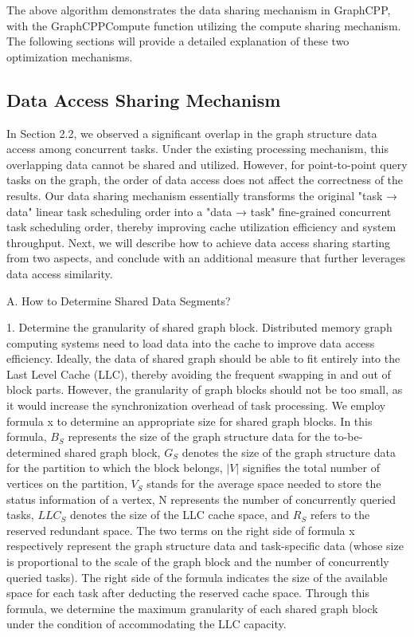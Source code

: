 \documentclass[lettersize,journal]{IEEEtran} %
\begin{document}
The above algorithm demonstrates the data sharing mechanism in GraphCPP, with the GraphCPPCompute function utilizing the compute sharing mechanism. The following sections will provide a detailed explanation of these two optimization mechanisms.

\subsection{Data Access Sharing Mechanism}
In Section 2.2, we observed a significant overlap in the graph structure data access among concurrent tasks. Under the existing processing mechanism, this overlapping data cannot be shared and utilized. However, for point-to-point query tasks on the graph, the order of data access does not affect the correctness of the results. Our data sharing mechanism essentially transforms the original "task → data" linear task scheduling order into a "data → task" fine-grained concurrent task scheduling order, thereby improving cache utilization efficiency and system throughput. Next, we will describe how to achieve data access sharing starting from two aspects, and conclude with an additional measure that further leverages data access similarity.

A. How to Determine Shared Data Segments?

1. Determine the granularity of shared graph block. Distributed memory graph computing systems need to load data into the cache to improve data access efficiency. Ideally, the data of shared graph should be able to fit entirely into the Last Level Cache (LLC), thereby avoiding the frequent swapping in and out of block parts. However, the granularity of graph blocks should not be too small, as it would increase the synchronization overhead of task processing. We employ formula x to determine an appropriate size for shared graph blocks. In this formula, $B_S$ represents the size of the graph structure data for the to-be-determined shared graph block, $G_S$ denotes the size of the graph structure data for the partition to which the block belongs, $|V|$ signifies the total number of vertices on the partition, $V_S$ stands for the average space needed to store the status information of a vertex, N represents the number of concurrently queried tasks, $LLC_S$ denotes the size of the LLC cache space, and $R_S$ refers to the reserved redundant space. The two terms on the right side of formula x respectively represent the graph structure data and task-specific data (whose size is proportional to the scale of the graph block and the number of concurrently queried tasks). The right side of the formula indicates the size of the available space for each task after deducting the reserved cache space. Through this formula, we determine the maximum granularity of each shared graph block under the condition of accommodating the LLC capacity.
\end{document}

